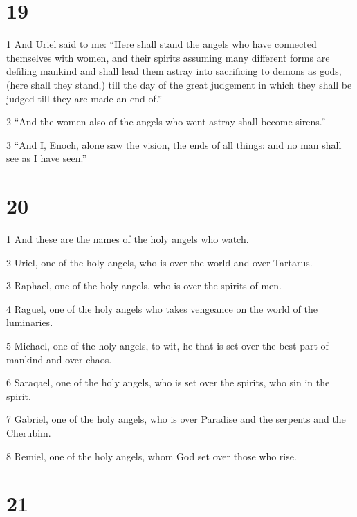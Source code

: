 \chapter{19}

\par 1 And Uriel said to me: “Here shall stand the angels who have connected themselves with women, and their spirits assuming many different forms are defiling mankind and shall lead them astray into sacrificing to demons as gods, (here shall they stand,) till the day of the great judgement in which they shall be judged till they are made an end of.”
\par 2 “And the women also of the angels who went astray shall become sirens.”
\par 3 “And I, Enoch, alone saw the vision, the ends of all things: and no man shall see as I have seen.”

\chapter{20}

\par 1 And these are the names of the holy angels who watch.
\par 2 Uriel, one of the holy angels, who is over the world and over Tartarus.
\par 3 Raphael, one of the holy angels, who is over the spirits of men. 
\par 4 Raguel, one of the holy angels who takes vengeance on the world of the luminaries. 
\par 5 Michael, one of the holy angels, to wit, he that is set over the best part of mankind and over chaos.
\par 6 Saraqael, one of the holy angels, who is set over the spirits, who sin in the spirit.
\par 7 Gabriel, one of the holy angels, who is over Paradise and the serpents and the Cherubim.
\par 8 Remiel, one of the holy angels, whom God set over those who rise.

\chapter{21}

